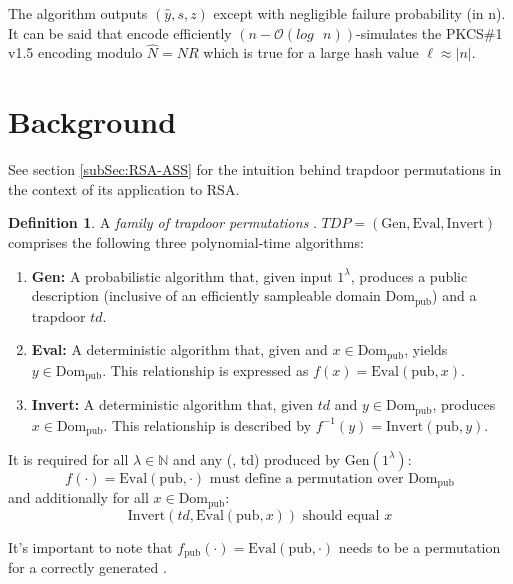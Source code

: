\documentclass[]{final_report}
\theoremstyle{definition}
\newtheorem{definition}{Definition}[chapter]
\begin{document}
The algorithm outputs \((\widehat{y}, s, z)\) except with negligible failure probability (in n). It can be said that encode efficiently $(n - \mathcal{O}(log \text{ } n))$-simulates the PKCS\#1 v1.5 encoding modulo $\hat{N} = NR$ which is true for a large hash value $\ell \approx |n|$.

\section{Background}
See section \ref{subSec:RSA-ASS} for the intuition behind trapdoor permutations in the context of its application to RSA.
\begin{definition}
\label{def:TDP}
A \textit{family of trapdoor permutations} \cite{10.1145/147508.147537}. \( TDP = (\text{Gen}, \text{Eval}, \text{Invert}) \) comprises the following three polynomial-time algorithms:
\begin{enumerate}
    \item \textbf{Gen:} A probabilistic algorithm that, given input \( 1^{\lambda} \), produces a public description  (inclusive of an efficiently sampleable domain \( \text{Dom}_{\text{pub}} \)) and a trapdoor \( td \).
    
    \item \textbf{Eval:} A deterministic algorithm that, given  and \( x \in \text{Dom}_{\text{pub}} \), yields \( y \in \text{Dom}_{\text{pub}} \). This relationship is expressed as \( f(x) = \text{Eval}(\text{pub}, x) \).
    
    \item \textbf{Invert:} A deterministic algorithm that, given \( td \) and \( y \in \text{Dom}_{\text{pub}} \), produces \( x \in \text{Dom}_{\text{pub}} \). This relationship is described by \( f^{-1}(y) = \text{Invert}(\text{pub}, y) \).
\end{enumerate}

It is required for all \( \lambda \in \mathbb{N} \) and any (, td) produced by \(\text{Gen}(1^{\lambda})\):
\[ f(\cdot) = \text{Eval}(\text{pub}, \cdot) \text{ must define a permutation over } \text{Dom}_{\text{pub}} \]
and additionally for all \( x \in \text{Dom}_{\text{pub}} \):
\[ \text{Invert}(td, \text{Eval}(\text{pub}, x)) \text{ should equal } x \]

It's important to note that \( f_{\text{pub}}(\cdot) = \text{Eval}(\text{pub}, \cdot) \) needs to be a permutation for a correctly generated . 
\end{definition}
\end{document}
